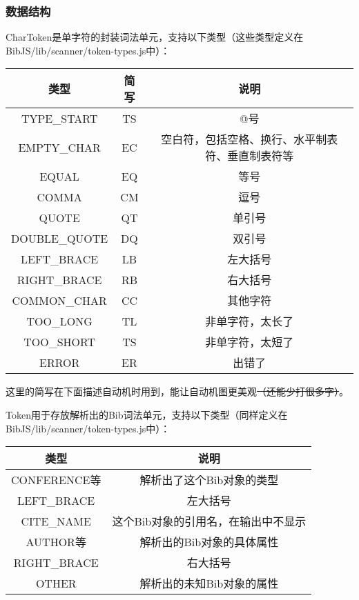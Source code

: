 \documentclass[a4paper]{article}
\begin{document}
\begin{CJK*}{UTF8}{gbsn}
    \subsubsection{数据结构}
    CharToken是单字符的封装词法单元，支持以下类型（这些类型定义在BibJS/lib/scanner/token-types.js中）：\par
    \begin{tabular}
        {|c|c|c|}
        \hline
        类型 & 简写 & 说明\\\hline
        TYPE\_START & TS & @号\\\hline
        EMPTY\_CHAR & EC & 空白符，包括空格、换行、水平制表符、垂直制表符等\\\hline
        EQUAL & EQ & 等号\\\hline
        COMMA & CM & 逗号\\\hline
        QUOTE & QT & 单引号\\\hline
        DOUBLE\_QUOTE & DQ & 双引号\\\hline
        LEFT\_BRACE & LB & 左大括号\\\hline
        RIGHT\_BRACE & RB & 右大括号\\\hline
        COMMON\_CHAR & CC & 其他字符\\\hline
        TOO\_LONG & TL & 非单字符，太长了\\\hline
        TOO\_SHORT & TS & 非单字符，太短了\\\hline
        ERROR & ER & 出错了\\\hline
    \end{tabular}
    \par 这里的简写在下面描述自动机时用到，能让自动机图更美观\sout{（还能少打很多字）}。
    \par Token用于存放解析出的Bib词法单元，支持以下类型（同样定义在BibJS/lib/scanner/token-types.js中）：\par 
    \begin{tabular}
        {|c|c|}
        \hline
        类型 & 说明\\\hline
        CONFERENCE等 & 解析出了这个Bib对象的类型\\\hline
        LEFT\_BRACE & 左大括号\\\hline
        CITE\_NAME & 这个Bib对象的引用名，在输出中不显示\\\hline
        AUTHOR等 & 解析出的Bib对象的具体属性\\\hline
        RIGHT\_BRACE & 右大括号\\\hline
        OTHER & 解析出的未知Bib对象的属性\\\hline

\end{tabular}
\end{CJK*}
\end{document}
